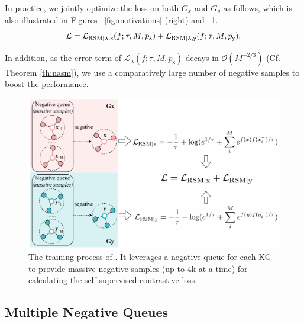In practice, we jointly optimize the loss on both ${G_x}$ and ${G_y}$ as follows, which is also illustrated in Figures ~\ref{fig:motivations} (right) and ~\ref{fig:modelflow}. 
\begin{equation} 
    \mathcal{L}=\mathcal{L}_{{\rm RSM|}\lambda,\mathsf{x}}(f;\tau,M,p_{\mathsf x}) + \mathcal{L}_{{\rm RSM|}\lambda,\mathsf{y}}(f;\tau,M,p_{\mathsf y}).
    \label{eq:xy}
\end{equation}

In addition, as the error term of $\mathcal{L}_\lambda(f;\tau,M,p_{\mathsf x})$ decays in $\mathcal{O}(M^{-2/3})$ (Cf. Theorem \ref{th:nasm}), we use a comparatively large number of negative samples to boost the performance. 



\begin{figure}[t]
\centering   
\includegraphics[width=0.99\columnwidth]{img/architecture_new3.pdf}
\caption{The training process of \solution. 
\textmd{It leverages a negative queue for each KG to provide massive negative samples (up to 4k at a time) for calculating the self-supervised contrastive loss.}
}
\label{fig:modelflow}
\vspace{-3mm}
\end{figure}




\subsection{Multiple Negative Queues}
\label{sec:mnq}

